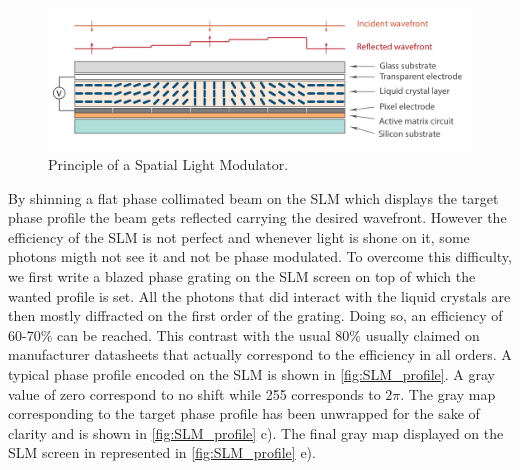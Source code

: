 \begin{figure}
    \centering
    \includegraphics[width=1\textwidth]{chap3_custom_st/fig/SLMprinciple.png}
    \caption{Principle of a Spatial Light Modulator.}
    \label{fig:SLM}
\end{figure}

\noindent By shinning a flat phase collimated beam on the SLM which displays the target phase profile the beam gets reflected carrying the desired wavefront.
However the efficiency of the SLM is not perfect and whenever light is shone on it, some photons migth not see it and not be phase modulated. To overcome this difficulty,
we first write a blazed phase grating on the SLM screen on top of which the wanted profile is set. All the photons that did interact with the liquid crystals are then mostly diffracted on the first order of the grating. Doing so,
an efficiency of 60-70\% can be reached. This contrast with the usual 80\% usually claimed on manufacturer datasheets that actually correspond to the efficiency in all orders. A typical phase profile encoded on the SLM is shown
in \autoref{fig:SLM_profile}. A gray value of zero correspond to no shift while 255 corresponds to $2\pi$. The gray map corresponding to the target phase profile has been unwrapped for the sake 
of clarity and is shown in \autoref{fig:SLM_profile} c). The final gray map displayed on the SLM screen in represented in \autoref{fig:SLM_profile} e). 

